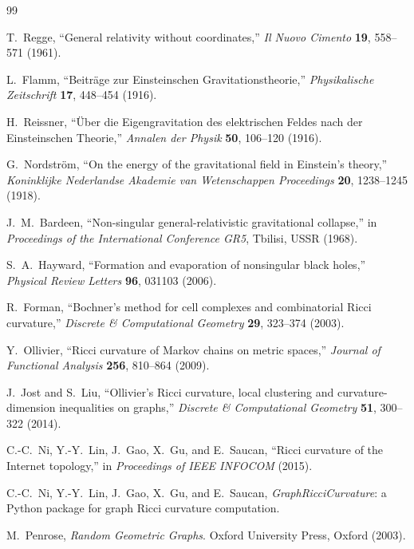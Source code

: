 \documentclass[11pt,a4paper]{article}
\begin{document}
\begin{thebibliography}{99}

T.~Regge,
``General relativity without coordinates,''
\textit{Il Nuovo Cimento} \textbf{19}, 558--571 (1961).

L.~Flamm,
``Beitr\"age zur Einsteinschen Gravitationstheorie,''
\textit{Physikalische Zeitschrift} \textbf{17}, 448--454 (1916).

H.~Reissner,
``\"Uber die Eigengravitation des elektrischen Feldes nach der Einsteinschen Theorie,''
\textit{Annalen der Physik} \textbf{50}, 106--120 (1916).

G.~Nordstr\"om,
``On the energy of the gravitational field in Einstein's theory,''
\textit{Koninklijke Nederlandse Akademie van Wetenschappen Proceedings} \textbf{20}, 1238--1245 (1918).

J.~M.~Bardeen,
``Non-singular general-relativistic gravitational collapse,''
in \textit{Proceedings of the International Conference GR5}, Tbilisi, USSR (1968).

S.~A.~Hayward,
``Formation and evaporation of nonsingular black holes,''
\textit{Physical Review Letters} \textbf{96}, 031103 (2006).

R.~Forman,
``Bochner's method for cell complexes and combinatorial Ricci curvature,''
\textit{Discrete \& Computational Geometry} \textbf{29}, 323--374 (2003).

Y.~Ollivier,
``Ricci curvature of Markov chains on metric spaces,''
\textit{Journal of Functional Analysis} \textbf{256}, 810--864 (2009).

J.~Jost and S.~Liu,
``Ollivier's Ricci curvature, local clustering and curvature-dimension inequalities on graphs,''
\textit{Discrete \& Computational Geometry} \textbf{51}, 300--322 (2014).

C.-C.~Ni, Y.-Y.~Lin, J.~Gao, X.~Gu, and E.~Saucan,
``Ricci curvature of the Internet topology,''
in \textit{Proceedings of IEEE INFOCOM} (2015).

C.-C.~Ni, Y.-Y.~Lin, J.~Gao, X.~Gu, and E.~Saucan,
\textit{GraphRicciCurvature}: a Python package for graph Ricci curvature computation.


M.~Penrose,
\textit{Random Geometric Graphs}.
Oxford University Press, Oxford (2003).


\end{thebibliography}
\end{document}
